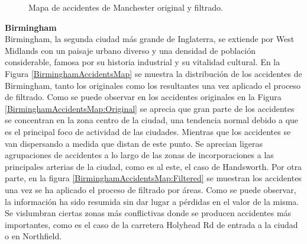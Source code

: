 \documentclass{uathesis-es}
\begin{document}
{\begin{figure}[H]
{          \label{ManchesterAccidentsMap:Filtered}
      }
      \caption{Mapa de accidentes de Manchester original y filtrado.}
      \label{ManchesterAccidentsMap}
  \end{figure}

\textbf{Birmingham}\\

Birmingham, la segunda ciudad más grande de Inglaterra, se extiende por West Midlands con un paisaje urbano diverso y una densidad de población considerable, famosa por su historia industrial y su vitalidad cultural. En la Figura \ref{BirminghamAccidentsMap} se muestra la distribución de los accidentes de Birmingham, tanto los originales como los resultantes una vez aplicado el proceso de filtrado. Como se puede observar en los accidentes originales en la Figura \ref{BirminghamAccidentsMap:Original} se aprecia que gran parte de los accidentes se concentran en la zona centro de la ciudad, una  tendencia normal debido a que es el principal foco de actividad de las ciudades. Mientras que los accidentes se van dispersando a medida que distan de este punto. Se aprecian ligeras agrupaciones de accidentes a lo largo de las zonas de incorporaciones a las principales arterias de la ciudad, como es al este, el caso de Handsworth. Por otra parte, en la figura \ref{BirminghamAccidentsMap:Filtered} se muestran los accidentes una vez se ha aplicado el proceso de filtrado por áreas. Como se puede observar, la información ha sido resumida sin dar lugar a pérdidas en el valor de la misma. Se vislumbran ciertas zonas más conflictivas donde se producen accidentes más importantes, como es el caso de la carretera Holyhead Rd de entrada a la ciudad o en Northfield.


}
\end{document}
